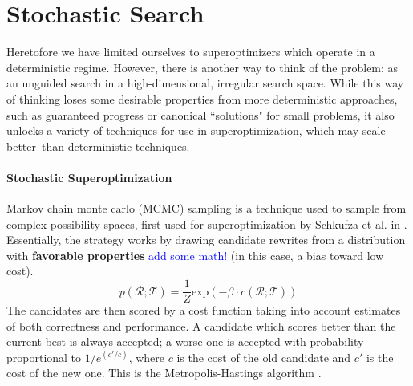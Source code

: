 \documentclass[12pt,twoside]{reedthesis}
\newcommand{\comment}[2]{\textbf{#1} \textcolor{blue}{#2}}
\begin{document}

\chapter{Stochastic Search}
    Heretofore we have limited ourselves to superoptimizers which operate in a deterministic regime.
    However, there is another way to think of the problem: as an unguided search in a high-dimensional, irregular search space.
    While this way of thinking loses some desirable properties from more deterministic approaches, such as guaranteed progress or canonical ``solutions" for small problems, it also unlocks a variety of techniques for use in superoptimization, which may scale better\footnotemark\, than deterministic techniques.
    
        
    \subsubsection{Stochastic Superoptimization}
        Markov chain monte carlo (MCMC) sampling is a technique used to sample from complex possibility spaces, first used for superoptimization by Schkufza et al. in \cite{schkufza2013stoke}.
        Essentially, the strategy works by drawing candidate rewrites from a distribution with \comment{favorable properties}{add some math!} (in this case, a bias toward low cost). %
        \[
            p(\mathcal{R;T}) = \frac{1}{Z} \mathrm{exp}\left(-\beta \cdot c(\mathcal{R;T})\right)
        \]
        The candidates are then scored by a cost function taking into account estimates of both correctness and performance.
        A candidate which scores better than the current best is always accepted; a worse one is accepted with probability proportional to $1/e^{(c'/c)}$, where $c$ is the cost of the old candidate and $c'$ is the cost of the new one. 
        This is the Metropolis-Hastings algorithm \cite{metropolis1953montecarlo} \cite{hastings1970mcmc}.
            
\end{document}
